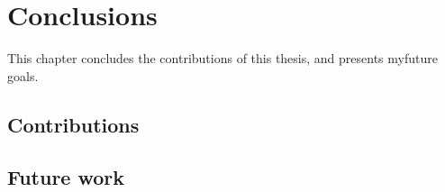\chapter{Conclusions}
This chapter concludes the contributions of this thesis, and presents myfuture goals.

\section{Contributions}
\section{Future work}
